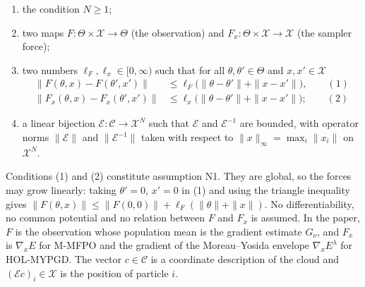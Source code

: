 \documentclass[11pt,a4paper]{report}
\begin{document}
\begin{enumerate}


\item the condition \(N\ge1\);

\item two maps \(F:\Theta\times\mathcal X\to\Theta\) (the observation) and \(F_x:\Theta\times\mathcal X\to\mathcal X\) (the sampler force);

\item two numbers \(\ell_F,\ell_x\in[0,\infty)\) such that for all \(\theta,\theta'\in\Theta\) and \(x,x'\in\mathcal X\)
\[\begin{aligned}\|F(\theta,x)-F(\theta',x')\|&\le\ell_F\bigl(\|\theta-\theta'\|+\|x-x'\|\bigr),\qquad(1)\\ \|F_x(\theta,x)-F_x(\theta',x')\|&\le\ell_x\bigl(\|\theta-\theta'\|+\|x-x'\|\bigr);\qquad(2)\end{aligned}\]

\item a linear bijection \(\mathcal E:\mathcal C\to\mathcal X^N\) such that \(\mathcal E\) and \(\mathcal E^{-1}\) are bounded, with operator norms \(\|\mathcal E\|\) and \(\|\mathcal E^{-1}\|\) taken with respect to \(\|x\|_\infty=\max_i\|x_i\|\) on \(\mathcal X^N\).

\end{enumerate}



Conditions (1) and (2) constitute assumption N1. They are global, so the forces may grow linearly: taking \(\theta'=0\), \(x'=0\) in (1) and using the triangle inequality gives \(\|F(\theta,x)\|\le\|F(0,0)\|+\ell_F(\|\theta\|+\|x\|)\). No differentiability, no common potential and no relation between \(F\) and \(F_x\) is assumed. In the paper, \(F\) is the observation whose population mean is the gradient estimate \(G_\nu\), and \(F_x\) is \(\nabla_xE\) for M-MFPO and the gradient of the Moreau–Yosida envelope \(\nabla_xE^\lambda\) for HOL-MYPGD. The vector \(c\in\mathcal C\) is a coordinate description of the cloud and \((\mathcal Ec)_i\in\mathcal X\) is the position of particle \(i\).
\end{document}

